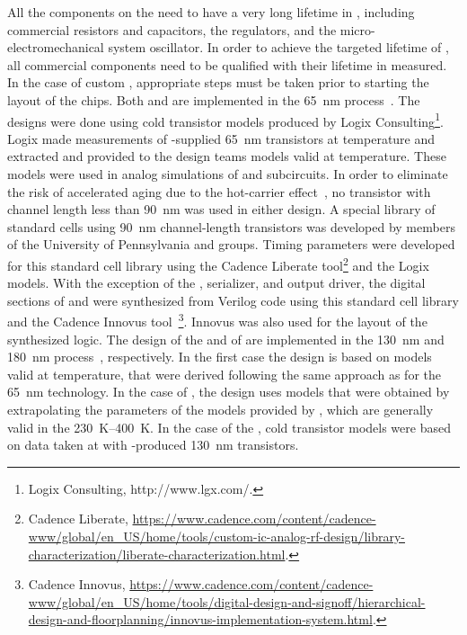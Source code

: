 All the components on the  need to have a very long lifetime
in , including commercial resistors and capacitors, the
 regulators, and the micro-electromechanical system oscillator.
In order to achieve the targeted lifetime of \dunelifetime{}, all commercial components 
need to be qualified with %
their lifetime in  %
measured. 
In the case of custom , appropriate steps must be taken prior 
to starting the layout of the chips. Both  and 
 are implemented in the  \SI{65}{nm}  
process~\cite{TSMC65}. The designs were done using cold transistor models 
produced by Logix Consulting\footnote{Logix\texttrademark{} Consulting, http://www.lgx.com/.}.  Logix made measurements of 
-supplied  \SI{65}{nm} transistors at \lntwo 
temperature and extracted and provided to the design teams  
models valid at \lntwo temperature.  These models were used in 
analog simulations of  and  subcircuits.  
In order to eliminate the risk of accelerated aging due to the hot-carrier
effect~\cite{Hot-electron}, no transistor with channel length
less than \SI{90}{nm} was used in either  design.
A special library of standard cells using \SI{90}{nm} channel-length 
transistors was developed by members of the University
of Pennsylvania and  groups. Timing parameters were
developed for this standard cell library using the Cadence Liberate
tool\footnote{Cadence Liberate\texttrademark{}, \url{https://www.cadence.com/content/cadence-www/global/en_US/home/tools/custom-ic-analog-rf-design/library-characterization/liberate-characterization.html}. } 
and the Logix ~\cite{spice} models. With the
exception of the  , serializer, and
output driver, the digital sections of  and
 were synthesized from Verilog code using this
standard cell library and the Cadence Innovus tool~\footnote{Cadence Innovus\texttrademark{}, \url{https://www.cadence.com/content/cadence-www/global/en_US/home/tools/digital-design-and-signoff/hierarchical-design-and-floorplanning/innovus-implementation-system.html}.}. 
Innovus was also used for the layout of the synthesized logic.
The design of the   and of 
are implemented in the  \SI{130}{nm} and \SI{180}{nm} 
 process~\cite{TSMC130,TSMC180}, respectively. In the
first case the design is based on  models valid at
\lntwo temperature, that were derived following the same approach
as for the \SI{65}{nm} technology. In the case of , 
the design uses models that were obtained by extrapolating the
parameters of the models provided by , which are 
generally valid in the \SIrange{230}{400}{K}. In the case of the 
, cold transistor models were based on data taken at  with
-produced \SI{130}{nm} transistors.

